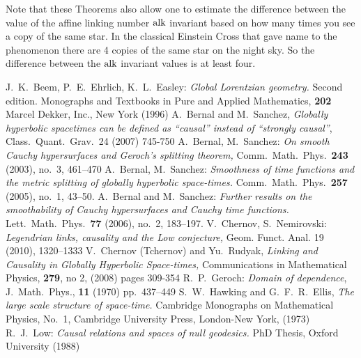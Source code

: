 \documentclass[12pt,reqno,a4paper]{amsart}
\begin{document}
\begin{rem}
Note that these Theorems also allow one to estimate the difference between the value of the affine linking number $\mathop{\mathrm{alk}}\nolimits$ invariant based on how many times you see a copy of the same star. In the classical Einstein Cross that gave name to the phenomenon there are 4 copies of the same star on the night sky. So the difference between the $\mathop{\mathrm{alk}}\nolimits$ invariant values is at least four.
\end{rem}


\begin{thebibliography}{99}
J.~K.~Beem, P.~E.~Ehrlich, K.~L.~Easley: {\em Global Lorentzian
geometry.\/} Second edition. Monographs and Textbooks in Pure and
Applied Mathematics, {\bf 202\/} Marcel Dekker, Inc., New York (1996)
A.~Bernal and M.~Sanchez, {\it Globally hyperbolic spacetimes can be defined as ``causal'' instead of 
``strongly causal''},  Class.~Quant.~Grav.~24 (2007) 745-750
A.~Bernal, M.~Sanchez: {\em On smooth Cauchy hypersurfaces and
Geroch's splitting theorem, \/} Comm.~Math.~Phys.~{\bf 243\/}
(2003), no.~3, 461--470
A.~Bernal, M.~Sanchez: {\em Smoothness of time functions and the
metric splitting of globally hyperbolic space-times.\/} Comm.~Math.~Phys.~{\bf 257} (2005), no.~1, 43--50.
A.~Bernal and M.~Sanchez: {\em Further results on the smoothability
of Cauchy hypersurfaces and Cauchy time functions.\/} Lett.~Math.~Phys.~{\bf 77} (2006), no.~2, 183--197.
V.~Chernov, S.~Nemirovski: {\em Legendrian links, causality and the Low conjecture,\/} Geom. Funct. Anal. 19 (2010), 1320--1333
V.~Chernov (Tchernov) and Yu.~Rudyak, {\it Linking and Causality in Globally Hyperbolic Space-times,\/} 
Communications in Mathematical Physics, {\bf 279}, no 2, (2008) pages 309-354
R.~P.~Geroch: {\em Domain of dependence\/}, J.~Math.~Phys., {\bf 11}
(1970) pp.~437--449
S.~W.~Hawking and G.~F.~R.~Ellis, {\em The large scale structure of
space-time.\/} Cambridge Monographs on Mathematical Physics, No.~1,
Cambridge University Press, London-New York, (1973)
R.~J.~Low: {\em Causal relations and spaces of null geodesics.\/}
PhD Thesis, Oxford University (1988)

\end{thebibliography}
\end{document}
